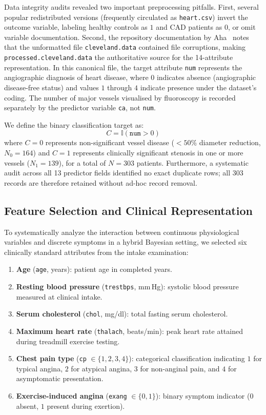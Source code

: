\documentclass[conference]{IEEEtran}
\begin{document}
Data integrity audits revealed two important preprocessing pitfalls. First, several popular redistributed versions (frequently circulated as \texttt{heart.csv}) invert the outcome variable, labeling healthy controls as $1$ and CAD patients as $0$, or omit variable documentation. Second, the repository documentation by Aha~\cite{aha1988} notes that the unformatted file \texttt{cleveland.data} contained file corruptions, making \texttt{processed.cleveland.data} the authoritative source for the 14-attribute representation. In this canonical file, the target attribute \texttt{num} represents the angiographic diagnosis of heart disease, where $0$ indicates absence (angiographic disease-free status) and values $1$ through $4$ indicate presence under the dataset's coding. The number of major vessels visualised by fluoroscopy is recorded separately by the predictor variable \texttt{ca}, not \texttt{num}.

We define the binary classification target as:
\begin{equation}
C = \mathbb{I}(\texttt{num} > 0)
\end{equation}
where $C=0$ represents non-significant vessel disease ($<50\%$ diameter reduction, $N_0 = 164$) and $C=1$ represents clinically significant stenosis in one or more vessels ($N_1 = 139$), for a total of $N = 303$ patients. Furthermore, a systematic audit across all 13 predictor fields identified no exact duplicate rows; all 303 records are therefore retained without ad-hoc record removal.

\subsection{Feature Selection and Clinical Representation}
To systematically analyze the interaction between continuous physiological variables and discrete symptoms in a hybrid Bayesian setting, we selected six clinically standard attributes from the intake examination:
\begin{enumerate}
\item \textbf{Age} (\texttt{age}, years): patient age in completed years.
\item \textbf{Resting blood pressure} (\texttt{trestbps}, mm\,Hg): systolic blood pressure measured at clinical intake.
\item \textbf{Serum cholesterol} (\texttt{chol}, mg/dl): total fasting serum cholesterol.
\item \textbf{Maximum heart rate} (\texttt{thalach}, beats/min): peak heart rate attained during treadmill exercise testing.
\item \textbf{Chest pain type} (\texttt{cp} $\in\{1,2,3,4\}$): categorical classification indicating $1$ for typical angina, $2$ for atypical angina, $3$ for non-anginal pain, and $4$ for asymptomatic presentation.
\item \textbf{Exercise-induced angina} (\texttt{exang} $\in\{0,1\}$): binary symptom indicator ($0$ absent, $1$ present during exertion).
\end{enumerate}
\end{document}
